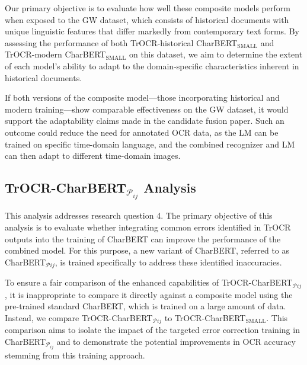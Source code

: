 Our primary objective is to evaluate how well these composite models perform when exposed to the GW dataset, which consists of historical documents with unique linguistic features that differ markedly from contemporary text forms. By assessing the performance of both TrOCR-historical CharBERT$_{\text{SMALL}}$ and TrOCR-modern CharBERT$_{\text{SMALL}}$ on this dataset, we aim to determine the extent of each model's ability to adapt to the domain-specific characteristics inherent in historical documents.

If both versions of the composite model—those incorporating historical and modern training—show comparable effectiveness on the GW dataset, it would support the adaptability claims made in the candidate fusion paper. Such an outcome could reduce the need for annotated OCR data, as the LM can be trained on specific time-domain language, and the combined recognizer and LM can then adapt to different time-domain images.

\subsection{TrOCR-CharBERT$_{\mathcal{P}_{ij}}$ Analysis}
\label{subsec:5_trocr_charbert_pij_analysis}
This analysis addresses research question 4. The primary objective of this analysis is to evaluate whether integrating common errors identified in TrOCR outputs into the training of CharBERT can improve the performance of the combined model. For this purpose, a new variant of CharBERT, referred to as CharBERT$_{\mathcal{P}{ij}}$, is trained specifically to address these identified inaccuracies.

To ensure a fair comparison of the enhanced capabilities of TrOCR-CharBERT$_{\mathcal{P}{ij}}$, it is inappropriate to compare it directly against a composite model using the pre-trained standard CharBERT, which is trained on a large amount of data. Instead, we compare TrOCR-CharBERT$_{\mathcal{P}{ij}}$ to TrOCR-CharBERT$_{\text{SMALL}}$. This comparison aims to isolate the impact of the targeted error correction training in CharBERT$_{\mathcal{P}_{ij}}$ and to demonstrate the potential improvements in OCR accuracy stemming from this training approach.